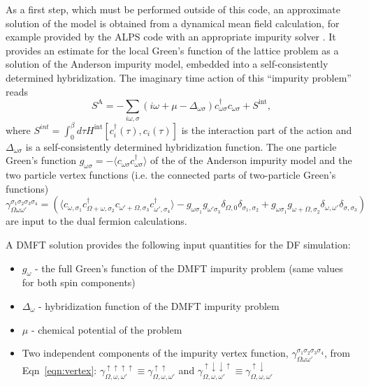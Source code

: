 \documentclass[3p,times,procedia]{elsarticle}
\begin{document}
As a first step, which must be performed outside of this code, an approximate solution of the model is obtained from a dynamical mean field calculation, for example provided by the ALPS code \cite{ALPS2} with an appropriate impurity solver \cite{Hafermann2013a}.
It provides an estimate for the local Green's function of the lattice problem as a  solution of the Anderson impurity model, embedded into a self-consistently determined hybridization. The imaginary time action of this ``impurity problem''  reads  
\begin{equation}
S^{\mathrm{A}} = -\sum_{i\omega,\sigma} (i\omega + \mu - \Delta_{\omega\sigma}) c^\dagger_{\omega\sigma} c_{\omega\sigma} + S^{\mathrm{int}},
\end{equation}
where $S^{int} = \int_0^\beta d\tau H^{\mathrm{int}} [c^\dagger_i(\tau), c_i(\tau)] $ is the interaction part of the action and $\Delta_{\omega\sigma}$ is a self-consistently determined hybridization function. 
The one particle Green's function $g_{\omega\sigma} = -\langle c_{\omega\sigma} c^\dagger_{\omega\sigma} \rangle$ of the of the Anderson impurity model and the two particle vertex functions (i.e. the connected parts of two-particle Green's functions)  
\begin{equation}\label{eqn:vertex}
\gamma_{\Omega\omega\omega'}^{\sigma_1\sigma_2\sigma_3\sigma_4} = \left(\langle c_{\omega,\sigma_1} c^\dagger_{\Omega + \omega,\sigma_2} c_{\omega' + \Omega, \sigma_3} c^\dagger_{\omega', \sigma_4}\rangle - g_{\omega\sigma_1}g_{\omega'\sigma_3}\delta_{\Omega,0}\delta_{\sigma_1,\sigma_2} + g_{\omega\sigma_1} g_{\omega + \Omega, \sigma_2} \delta_{\omega,\omega'}\delta_{\sigma, \sigma_3} \right)
\end{equation}
are input to the dual fermion calculations. 

A DMFT solution provides the following input quantities for the DF simulation:
\begin{itemize}
\item $g_\omega$ - the full Green's function of the DMFT impurity problem (same values for both spin components)
\item $\Delta_{\omega}$ - hybridization function of the DMFT impurity problem
\item $\mu$ - chemical potential of the problem
\item Two independent components of the impurity vertex function, $\gamma_{\Omega\omega\omega'}^{\sigma_1\sigma_2\sigma_3\sigma_4}$, from Eqn~\eqref{eqn:vertex}: $\gamma_{\Omega,\omega,\omega'}^{\uparrow\uparrow\uparrow\uparrow} \equiv \gamma^{\uparrow\uparrow}_{\Omega,\omega,\omega'} $ and $\gamma_{\Omega,\omega,\omega'}^{\uparrow\downarrow\downarrow\uparrow} \equiv  \gamma^{\uparrow\downarrow}_{\Omega,\omega,\omega'} $
\end{itemize}
\end{document}
